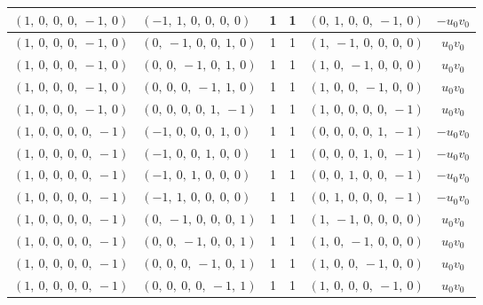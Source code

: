 \documentclass[11pt]{article}
\theoremstyle{definition}
\begin{document}
\begin{longtable}{|l|l|c|c|l|c|}
    \hline
    $\left( 1, \  0, \  0, \  0, \  -1, \  0\right)$ & $\left( -1, \  1, \  0, \  0, \  0, \  0\right)$ & 1 & 1 & $\left( 0, \  1, \  0, \  0, \  -1, \  0\right)$ & $- u_{0} v_{0}$ \\
    \hline
    $\left( 1, \  0, \  0, \  0, \  -1, \  0\right)$ & $\left( 0, \  -1, \  0, \  0, \  1, \  0\right)$ & 1 & 1 & $\left( 1, \  -1, \  0, \  0, \  0, \  0\right)$ & $u_{0} v_{0}$ \\
    \hline
    $\left( 1, \  0, \  0, \  0, \  -1, \  0\right)$ & $\left( 0, \  0, \  -1, \  0, \  1, \  0\right)$ & 1 & 1 & $\left( 1, \  0, \  -1, \  0, \  0, \  0\right)$ & $u_{0} v_{0}$ \\
    \hline
    $\left( 1, \  0, \  0, \  0, \  -1, \  0\right)$ & $\left( 0, \  0, \  0, \  -1, \  1, \  0\right)$ & 1 & 1 & $\left( 1, \  0, \  0, \  -1, \  0, \  0\right)$ & $u_{0} v_{0}$ \\
    \hline
    $\left( 1, \  0, \  0, \  0, \  -1, \  0\right)$ & $\left( 0, \  0, \  0, \  0, \  1, \  -1\right)$ & 1 & 1 & $\left( 1, \  0, \  0, \  0, \  0, \  -1\right)$ & $u_{0} v_{0}$ \\
    \hline
    $\left( 1, \  0, \  0, \  0, \  0, \  -1\right)$ & $\left( -1, \  0, \  0, \  0, \  1, \  0\right)$ & 1 & 1 & $\left( 0, \  0, \  0, \  0, \  1, \  -1\right)$ & $- u_{0} v_{0}$ \\
    \hline
    $\left( 1, \  0, \  0, \  0, \  0, \  -1\right)$ & $\left( -1, \  0, \  0, \  1, \  0, \  0\right)$ & 1 & 1 & $\left( 0, \  0, \  0, \  1, \  0, \  -1\right)$ & $- u_{0} v_{0}$ \\
    \hline
    $\left( 1, \  0, \  0, \  0, \  0, \  -1\right)$ & $\left( -1, \  0, \  1, \  0, \  0, \  0\right)$ & 1 & 1 & $\left( 0, \  0, \  1, \  0, \  0, \  -1\right)$ & $- u_{0} v_{0}$ \\
    \hline
    $\left( 1, \  0, \  0, \  0, \  0, \  -1\right)$ & $\left( -1, \  1, \  0, \  0, \  0, \  0\right)$ & 1 & 1 & $\left( 0, \  1, \  0, \  0, \  0, \  -1\right)$ & $- u_{0} v_{0}$ \\
    \hline
    $\left( 1, \  0, \  0, \  0, \  0, \  -1\right)$ & $\left( 0, \  -1, \  0, \  0, \  0, \  1\right)$ & 1 & 1 & $\left( 1, \  -1, \  0, \  0, \  0, \  0\right)$ & $u_{0} v_{0}$ \\
    \hline
    $\left( 1, \  0, \  0, \  0, \  0, \  -1\right)$ & $\left( 0, \  0, \  -1, \  0, \  0, \  1\right)$ & 1 & 1 & $\left( 1, \  0, \  -1, \  0, \  0, \  0\right)$ & $u_{0} v_{0}$ \\
    \hline
    $\left( 1, \  0, \  0, \  0, \  0, \  -1\right)$ & $\left( 0, \  0, \  0, \  -1, \  0, \  1\right)$ & 1 & 1 & $\left( 1, \  0, \  0, \  -1, \  0, \  0\right)$ & $u_{0} v_{0}$ \\
    \hline
    $\left( 1, \  0, \  0, \  0, \  0, \  -1\right)$ & $\left( 0, \  0, \  0, \  0, \  -1, \  1\right)$ & 1 & 1 & $\left( 1, \  0, \  0, \  0, \  -1, \  0\right)$ & $u_{0} v_{0}$ \\
    \hline
\end{longtable}
\end{document}
